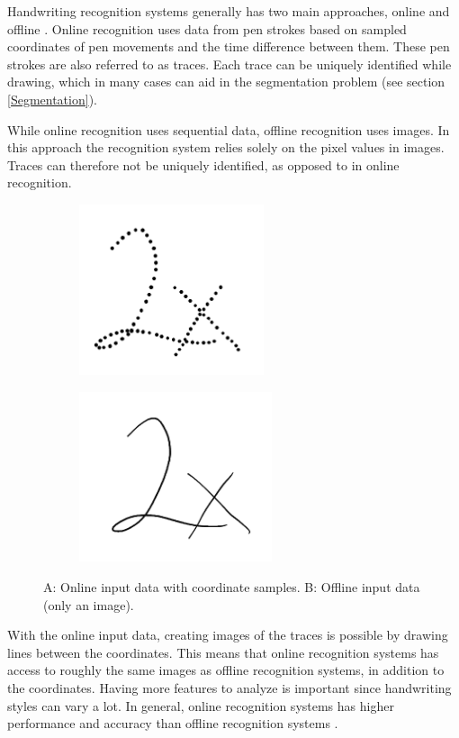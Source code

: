 Handwriting recognition systems generally has two main approaches, online and offline \cite{priya_online_2016}. Online recognition uses data from pen strokes based on sampled coordinates of pen movements and the time difference between them. These pen strokes are also referred to as traces.  Each trace can be uniquely identified while drawing, which in many cases can aid in the segmentation problem (see section \ref{Segmentation}).

While online recognition uses sequential data, offline recognition uses images. In this approach the recognition system relies solely on the pixel values in images. Traces can therefore not be uniquely identified, as opposed to in online recognition.


\begin{figure}[H]
\centering
\begin{subfigure}{0.3\textwidth}
\includegraphics[width=1.1\linewidth, height=5cm]{Assets/Chapter2_Theory/segmentation_2_on.png} 
\caption{}
\label{fig:online_data}
\end{subfigure}
\begin{subfigure}{0.3\textwidth}
\includegraphics[width=1.1\linewidth, height=5cm]{Assets/Chapter2_Theory/segmentation_2.png}
\caption{}
\label{fig:offline_data}
\end{subfigure}
\caption{A: Online input data with coordinate samples. B: Offline input data (only an image).}
\label{fig:online_offline_comparison}
\end{figure}

With the online input data, creating images of the traces is possible by drawing lines between the coordinates. This means that online recognition systems has access to roughly the same images as offline recognition systems, in addition to the coordinates. Having more features to analyze is important since handwriting styles can vary a lot. In general, online recognition systems has higher performance and accuracy than offline recognition systems \cite{priya_online_2016}.

